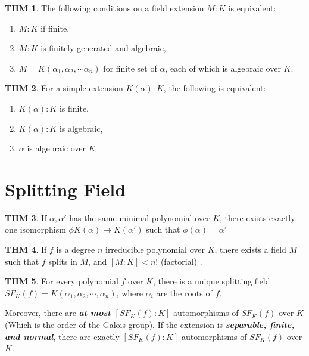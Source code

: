 \documentclass[twocolumn]{article}
\renewcommand{\emph}[1]{\textbf{\textit{#1}}}
\theoremstyle{definition}
\newtheorem{thm}{THM}
\theoremstyle{remark}
\begin{document}
\begin{thm}
	The following conditions on a field extension $M:K$ is equivalent:
	\begin{enumerate}
		\item $M:K$ if finite,
		\item $M:K$ is finitely generated and algebraic,
		\item $M = K(\alpha_1, \alpha_2, \cdots \alpha_n)$ for finite set of $\alpha$, each of which is algebraic over $K$.
	\end{enumerate}
\end{thm}

\begin{thm}
	For a simple extension $K(\alpha) :K$, the following is equivalent:
	\begin{enumerate}
		\item $K(\alpha): K$ is finite,
		\item $K(\alpha): K$ is algebraic,
		\item $\alpha$ is algebraic over $K$
	\end{enumerate}
\end{thm}

\section{Splitting Field}

\begin{thm}
	If $\alpha, \alpha'$ has the same minimal polynomial over $K$, there exists exactly one isomorphism $\phi K(\alpha) \rightarrow K(\alpha')$ such that $\phi(\alpha) = \alpha'$
\end{thm}

\begin{thm}
	If $f$ is a degree $n$ irreducible polynomial over $K$, there exists a field $M$ such that $f$ splits in $M$, and $[M:K] < n!$ (factorial) .
\end{thm}

\begin{thm}
	For every polynomial $f$ over $K$, there is a unique splitting field $SF_{K}(f) = K (\alpha_1, \alpha_2, \cdots, \alpha_n)$, where $\alpha_i$ are the roots of $f$.

	Moreover, there are \emph{at most $[SF_{K}(f):K]$} automorphisms of $SF_{K}(f)$ over $K$ (Which is the order of the Galois group). 
	If the extension is \emph{separable, finite, and normal}, there are exactly $[SF_{K}(f):K]$ automorphisms of $SF_{K}(f)$ over $K$.
\end{thm}
\end{document}

